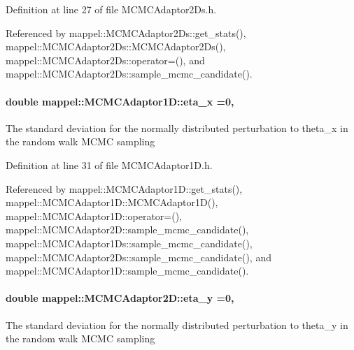 Definition at line 27 of file M\+C\+M\+C\+Adaptor2\+Ds.\+h.



Referenced by mappel\+::\+M\+C\+M\+C\+Adaptor2\+Ds\+::get\+\_\+stats(), mappel\+::\+M\+C\+M\+C\+Adaptor2\+Ds\+::\+M\+C\+M\+C\+Adaptor2\+Ds(), mappel\+::\+M\+C\+M\+C\+Adaptor2\+Ds\+::operator=(), and mappel\+::\+M\+C\+M\+C\+Adaptor2\+Ds\+::sample\+\_\+mcmc\+\_\+candidate().

\paragraph[{\texorpdfstring{eta\+\_\+x}{eta_x}}]{\setlength{\rightskip}{0pt plus 5cm}double mappel\+::\+M\+C\+M\+C\+Adaptor1\+D\+::eta\+\_\+x =0\hspace{0.3cm}{\ttfamily [protected]}, {\ttfamily [inherited]}}\hypertarget{classmappel_1_1MCMCAdaptor1D_ae5787e38c9cef6168acf6fc5d3216693}{}\label{classmappel_1_1MCMCAdaptor1D_ae5787e38c9cef6168acf6fc5d3216693}
The standard deviation for the normally distributed perturbation to theta\+\_\+x in the random walk M\+C\+MC sampling 

Definition at line 31 of file M\+C\+M\+C\+Adaptor1\+D.\+h.



Referenced by mappel\+::\+M\+C\+M\+C\+Adaptor1\+D\+::get\+\_\+stats(), mappel\+::\+M\+C\+M\+C\+Adaptor1\+D\+::\+M\+C\+M\+C\+Adaptor1\+D(), mappel\+::\+M\+C\+M\+C\+Adaptor1\+D\+::operator=(), mappel\+::\+M\+C\+M\+C\+Adaptor2\+D\+::sample\+\_\+mcmc\+\_\+candidate(), mappel\+::\+M\+C\+M\+C\+Adaptor1\+Ds\+::sample\+\_\+mcmc\+\_\+candidate(), mappel\+::\+M\+C\+M\+C\+Adaptor2\+Ds\+::sample\+\_\+mcmc\+\_\+candidate(), and mappel\+::\+M\+C\+M\+C\+Adaptor1\+D\+::sample\+\_\+mcmc\+\_\+candidate().

\paragraph[{\texorpdfstring{eta\+\_\+y}{eta_y}}]{\setlength{\rightskip}{0pt plus 5cm}double mappel\+::\+M\+C\+M\+C\+Adaptor2\+D\+::eta\+\_\+y =0\hspace{0.3cm}{\ttfamily [protected]}, {\ttfamily [inherited]}}\hypertarget{classmappel_1_1MCMCAdaptor2D_a8e49652147538fe2a12943522f1a8b30}{}\label{classmappel_1_1MCMCAdaptor2D_a8e49652147538fe2a12943522f1a8b30}
The standard deviation for the normally distributed perturbation to theta\+\_\+y in the random walk M\+C\+MC sampling 

